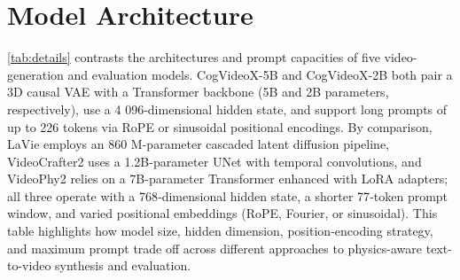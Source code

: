 \section{Model Architecture}
\cref{tab:details} contrasts the architectures and prompt capacities of five video-generation and evaluation models.
CogVideoX-5B and CogVideoX-2B \cite{wang2024cogvideodex} both pair a 3D causal VAE with a Transformer backbone (5B and 2B parameters, respectively), use a 4 096‐dimensional hidden state, and support long prompts of up to 226 tokens via RoPE or sinusoidal positional encodings.
By comparison, LaVie \cite{wang2023lavie} employs an 860 M-parameter cascaded latent diffusion pipeline, VideoCrafter2 \cite{chen2024videocrafter2} uses a 1.2B-parameter UNet with temporal convolutions, and VideoPhy2 \cite{bansal2025videophy2} relies on a 7B-parameter Transformer enhanced with LoRA adapters; all three operate with a 768‐dimensional hidden state, a shorter 77‐token prompt window, and varied positional embeddings (RoPE, Fourier, or sinusoidal).
This table highlights how model size, hidden dimension, position‐encoding strategy, and maximum prompt trade off across different approaches to physics-aware text-to-video synthesis and evaluation.

\begin{table}[h]
\centering
\caption{Model details reported across the four papers.}
\label{tab:details}
{}
\end{table}
